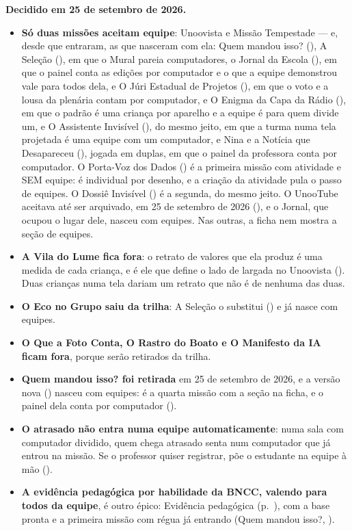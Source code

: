 \begin{decisao}
\textbf{Decidido em 25 de setembro de 2026.}
\begin{itemize}
  \item \textbf{Só duas missões aceitam equipe}: Unoovista e Missão
    Tempestade --- e, desde que entraram, as que nasceram com ela: Quem mandou
    isso? (), A Seleção (), em que o Mural pareia
    computadores, o Jornal da Escola (), em que o painel conta
    as edições por computador e o que a equipe demonstrou vale para todos
    dela, e O Júri Estadual de Projetos (), em que o voto e a
    lousa da plenária contam por computador, e O Enigma da Capa da Rádio
    (), em que o padrão é uma criança por aparelho e a equipe é
    para quem divide um, e O Assistente Invisível (), do mesmo
    jeito, em que a turma numa tela projetada é uma equipe com um
    computador, e Nina e a Notícia que Desapareceu (), jogada em
    duplas, em que o painel da professora conta por computador. O Porta-Voz
    dos Dados () é a primeira missão com atividade e SEM equipe: é
    individual por desenho, e a criação da atividade pula o passo de equipes.
    O Dossiê Invisível () é a segunda, do mesmo jeito.
    O UnooTube aceitava até ser arquivado, em 25 de setembro de 2026
    (), e o Jornal, que ocupou o lugar dele, nasceu com equipes. Nas
    outras, a ficha nem mostra a seção de equipes.
  \item \textbf{A Vila do Lume fica fora}: o retrato de valores que ela
    produz é uma medida de cada criança, e é ele que define o lado de largada
    no Unoovista (). Duas crianças numa tela dariam um retrato
    que não é de nenhuma das duas.
  \item \textbf{O Eco no Grupo saiu da trilha}: A Seleção o substitui
    () e já nasce com equipes.
  \item \textbf{O Que a Foto Conta, O Rastro do Boato e O Manifesto da IA ficam
    fora}, porque serão retirados da trilha.
  \item \textbf{Quem mandou isso? foi retirada} em 25 de setembro de 2026, e a
    versão nova () nasceu com equipes: é a quarta missão com a seção
    na ficha, e o painel dela conta por computador ().
  \item \textbf{O atrasado não entra numa equipe automaticamente}: numa sala
    com computador dividido, quem chega atrasado senta num computador que já
    entrou na missão. Se o professor quiser registrar, põe o estudante na
    equipe à mão ().
  \item \textbf{A evidência pedagógica por habilidade da BNCC, valendo para
    todos da equipe}, é outro épico:  Evidência pedagógica
    (p.~\pageref{ep:e14}), com a base pronta e a primeira missão com régua já
    entrando (Quem mandou isso?, ).
\end{itemize}
\end{decisao}

